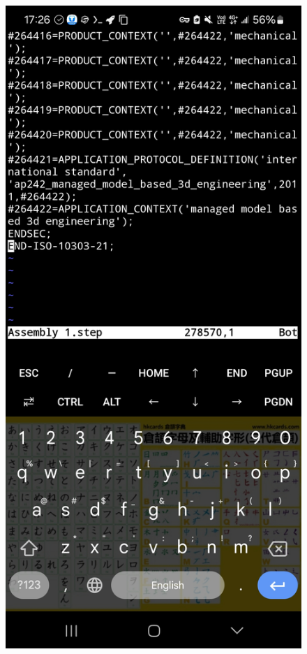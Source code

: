 \documentclass[a4paper,12pt]{./article}
\begin{document}
\begin{center}\begin{figure}[H]\centering
\hfill
\begin{minipage}[t]{./0.45\textwidth}
\centering
\includegraphics[width=\textwidth]{./working_screenshots/3.jpg}

\end{minipage}
\end{figure}
\end{center}
\end{document}
